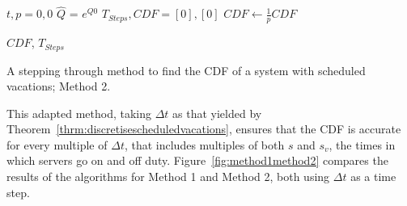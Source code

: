 \documentclass{article}
\begin{document}
\begin{algorithm}[!hbtp]
\DontPrintSemicolon
{}

\BlankLine

$t, p = 0, 0$\;
$\hat{Q}$ = $e^{Q 0}$\;
$T_{Steps}, CDF = [0], [0]$\;
$CDF \leftarrow \frac{1}{p}CDF$\;
\BlankLine

\KwRet $CDF$, $T_{Steps}$
\caption{A stepping through method to find the CDF of a system with scheduled vacations; Method 2.}
\label{alg:findcdfSV2}
\end{algorithm}

This adapted method, taking $\Delta t$ as that yielded by Theorem~\ref{thrm:discretisescheduledvacations}, ensures that the CDF is accurate for every multiple of $\Delta t$, that includes multiples of both $s$ and $s_v$, the times in which servers go on and off duty.
Figure~\ref{fig:method1method2} compares the results of the algorithms for Method 1 and Method 2, both using $\Delta t$ as a time step.
\end{document}
